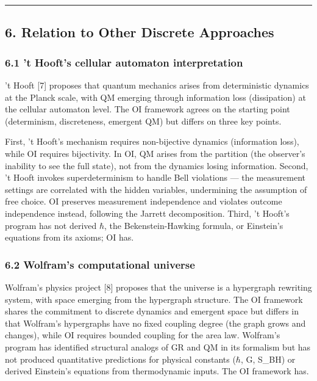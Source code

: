 \documentclass[
  11pt,
]{article}
\begin{document}
\begin{center}\rule{0.5\linewidth}{0.5pt}\end{center}

\hypertarget{relation-to-other-discrete-approaches}{%
\subsection{6. Relation to Other Discrete
Approaches}\label{relation-to-other-discrete-approaches}}

\hypertarget{t-hoofts-cellular-automaton-interpretation}{%
\subsubsection{6.1 't Hooft's cellular automaton
interpretation}\label{t-hoofts-cellular-automaton-interpretation}}

't Hooft {[}7{]} proposes that quantum mechanics arises from
deterministic dynamics at the Planck scale, with QM emerging through
information loss (dissipation) at the cellular automaton level. The OI
framework agrees on the starting point (determinism, discreteness,
emergent QM) but differs on three key points.

First, 't Hooft's mechanism requires non-bijective dynamics (information
loss), while OI requires bijectivity. In OI, QM arises from the
partition (the observer's inability to see the full state), not from the
dynamics losing information. Second, 't Hooft invokes superdeterminism
to handle Bell violations --- the measurement settings are correlated
with the hidden variables, undermining the assumption of free choice. OI
preserves measurement independence and violates outcome independence
instead, following the Jarrett decomposition. Third, 't Hooft's program
has not derived \ensuremath{\hbar}, the Bekenstein-Hawking formula, or Einstein's
equations from its axioms; OI has.

\hypertarget{wolframs-computational-universe}{%
\subsubsection{6.2 Wolfram's computational
universe}\label{wolframs-computational-universe}}

Wolfram's physics project {[}8{]} proposes that the universe is a
hypergraph rewriting system, with space emerging from the hypergraph
structure. The OI framework shares the commitment to discrete dynamics
and emergent space but differs in that Wolfram's hypergraphs have no
fixed coupling degree (the graph grows and changes), while OI requires
bounded coupling for the area law. Wolfram's program has identified
structural analogs of GR and QM in its formalism but has not produced
quantitative predictions for physical constants (\ensuremath{\hbar}, G, S\_BH) or derived
Einstein's equations from thermodynamic inputs. The OI framework has.
\end{document}
